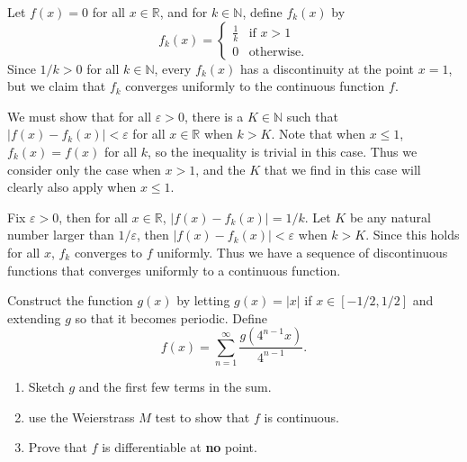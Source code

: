 \documentclass[10pt]{amsart}
\newenvironment{exercise}[1]{%
        \vspace{10mm}
        \renewcommand\themanualtheoreminner{#1}%
  \manualtheoreminner
}\hrulefill{\endmanualtheoreminner}
\begin{document}
Let $f(x)=0$ for all $x \in \mathbb{R}$, and for $k \in \mathbb{N}$, define $f_k(x)$ by
\[
	f_k(x) =
	\begin{cases}
		\frac{1}{k} & \text{if } x>1 \\
		0 & \text{otherwise}.
	\end{cases}
\] Since $1/k > 0$ for all $k \in \mathbb{N}$, every $f_k(x)$ has a discontinuity at the point $x=1$, but we claim that $f_k$ converges uniformly to the continuous function $f$.

We must show that for all $\varepsilon>0$, there is a $K \in \mathbb{N}$ such that $|f(x) - f_k(x)| < \varepsilon$ for all $x \in \mathbb{R}$ when $k > K$. Note that when $x \leq 1$, $f_k(x) = f(x)$ for all $k$, so the inequality is trivial in this case. Thus we consider only the case when $x > 1$, and the $K$ that we find in this case will clearly also apply when $x \leq 1$.

Fix $\varepsilon>0$, then for all $x \in \mathbb{R}$, $|f(x) - f_k(x)| = 1/k$. Let $K$ be any natural number larger than $1/\varepsilon$, then $|f(x)-f_k(x)| < \varepsilon$ when $k > K$. Since this holds for all $x$, $f_k$ converges to $f$ uniformly. Thus we have a sequence of discontinuous functions that converges uniformly to a continuous function.

\begin{exercise}{Page 319, Ex. 20}
	Construct the function $g(x)$ by letting $g(x) = |x|$ if $x \in [-1/2,1/2]$ and extending $g$ so that it becomes periodic. Define
	\[
		f(x) = \sum_{n=1}^{\infty} \frac{g(4^{n-1}x)}{4^{n-1}} .
	\]
	\begin{enumerate}
		\item Sketch $g$ and the first few terms in the sum.
		\item use the Weierstrass $M$ test to show that $f$ is continuous.
		\item Prove that $f$ is differentiable at \textbf{no} point.
	\end{enumerate}
\end{exercise}
\end{document}
